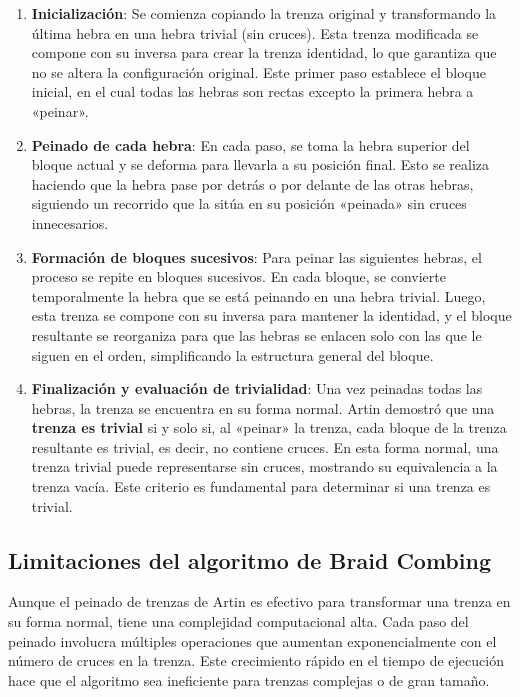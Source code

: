 \begin{enumerate}
    \item \textbf{Inicialización}: Se comienza copiando la trenza original y transformando la última hebra en una hebra trivial (sin cruces). Esta trenza modificada se compone con su inversa para crear la trenza identidad, lo que garantiza que no se altera la configuración original. Este primer paso establece el bloque inicial, en el cual todas las hebras son rectas excepto la primera hebra a «peinar».

    \item \textbf{Peinado de cada hebra}: En cada paso, se toma la hebra superior del bloque actual y se deforma para llevarla a su posición final. Esto se realiza haciendo que la hebra pase por detrás o por delante de las otras hebras, siguiendo un recorrido que la sitúa en su posición «peinada» sin cruces innecesarios.

    \item \textbf{Formación de bloques sucesivos}: Para peinar las siguientes hebras, el proceso se repite en bloques sucesivos. En cada bloque, se convierte temporalmente la hebra que se está peinando en una hebra trivial. Luego, esta trenza se compone con su inversa para mantener la identidad, y el bloque resultante se reorganiza para que las hebras se enlacen solo con las que le siguen en el orden, simplificando la estructura general del bloque.

    \item \textbf{Finalización y evaluación de trivialidad}: Una vez peinadas todas las hebras, la trenza se encuentra en su forma normal. Artin demostró que una \textbf{trenza es trivial} si y solo si, al «peinar» la trenza, cada bloque de la trenza resultante es trivial, es decir, no contiene cruces. En esta forma normal, una trenza trivial puede representarse sin cruces, mostrando su equivalencia a la trenza vacía. Este criterio es fundamental para determinar si una trenza es trivial.
\end{enumerate}

\subsection{Limitaciones del algoritmo de Braid Combing}

Aunque el peinado de trenzas de Artin es efectivo para transformar una trenza en su forma normal, tiene una complejidad computacional alta. Cada paso del peinado involucra múltiples operaciones que aumentan exponencialmente con el número de cruces en la trenza. Este crecimiento rápido en el tiempo de ejecución hace que el algoritmo sea ineficiente para trenzas complejas o de gran tamaño.

